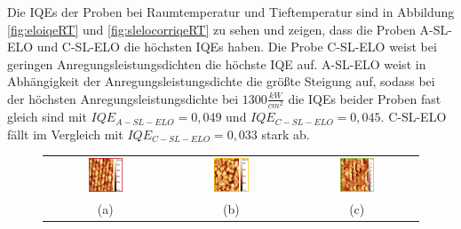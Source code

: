 \noindent 
Die IQEs der Proben bei Raumtemperatur und Tieftemperatur sind in Abbildung \ref{fig:eloiqeRT} und \ref{fig:slelocorriqeRT} zu sehen und zeigen, dass die Proben A-SL-ELO und C-SL-ELO die höchsten IQEs haben. Die Probe C-SL-ELO weist bei geringen Anregungsleistungsdichten die höchste IQE auf. A-SL-ELO weist in Abhängigkeit der Anregungsleistungsdichte die größte Steigung auf, sodass bei der höchsten Anregungsleistungsdichte bei $ 1300 \frac{kW}{cm^2} $ die IQEs beider Proben fast gleich sind mit $IQE_{A-SL-ELO} = 0,049 $ und $IQE_{C-SL-ELO} = 0,045$. C-SL-ELO fällt im Vergleich mit $IQE_{C-SL-ELO} = 0,033$ stark ab.  
\begin{figure}[htb]
\begin{tabular}{ccc}
  \includegraphics[width=0.30\textwidth]{Bilder/TS4048/aSLELOafm.png} & \includegraphics[width=0.30\textwidth]{Bilder/TS4048/bSLELOafm.png}  & \includegraphics[width=0.30\textwidth]{Bilder/TS4048/cSLELOafm.png} \\
(a) & (b) & (c) \\[6pt]

\end{tabular}
\end{figure}
